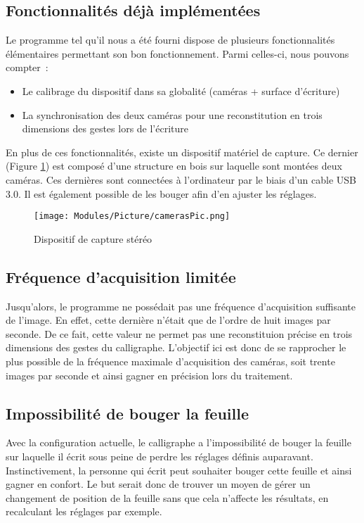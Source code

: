 \subsection{Fonctionnalités déjà implémentées}

Le programme tel qu'il nous a été fourni dispose de plusieurs fonctionnalités élémentaires permettant son bon fonctionnement. Parmi celles-ci, nous pouvons compter~:
\begin{itemize}
\item Le calibrage du dispositif dans sa globalité (caméras + surface d'écriture)
\item La synchronisation des deux caméras pour une reconstitution en trois dimensions des gestes lors de l'écriture
\end{itemize}
En plus de ces fonctionnalités, existe un dispositif matériel de capture. Ce dernier (Figure \ref{cameras}) est composé d'une structure en bois sur laquelle sont montées deux caméras. Ces dernières sont connectées à l'ordinateur par le biais d'un cable USB 3.0. Il est également possible de les bouger afin d'en ajuster les réglages.

\begin{figure}[!h]
\centering
\texttt{[image: Modules/Picture/camerasPic.png]}
\caption{Dispositif de capture stéréo}
\label{cameras}
\end{figure}

\subsection{Fréquence d'acquisition limitée}

Jusqu'alors, le programme ne possédait pas une fréquence d'acquisition suffisante de l'image. En effet, cette dernière n'était que de l'ordre de huit images par seconde. De ce fait, cette valeur ne permet pas une reconstituion précise en trois dimensions des gestes du calligraphe. L'objectif ici est donc de se rapprocher le plus possible de la fréquence maximale d'acquisition des caméras, soit trente images par seconde et ainsi gagner en précision lors du traitement.

\subsection{Impossibilité de bouger la feuille}

Avec la configuration actuelle, le calligraphe a l'impossibilité de bouger la feuille sur laquelle il écrit sous peine de perdre les réglages définis auparavant. Instinctivement, la personne qui écrit peut souhaiter bouger cette feuille et ainsi gagner en confort. Le but serait donc de trouver un moyen de gérer un changement de position de la feuille sans que cela n'affecte les résultats, en recalculant les réglages par exemple.

